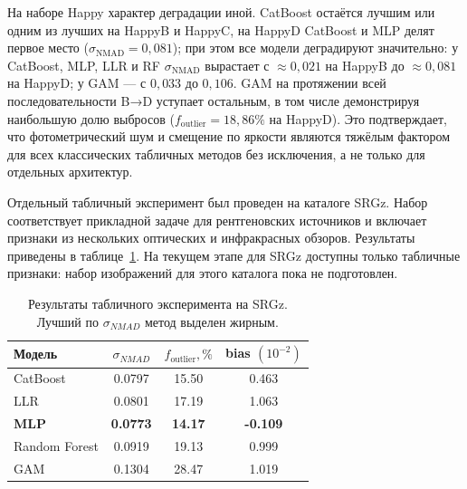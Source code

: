 \documentclass[12pt,a4paper]{article}
\begin{document}
На наборе Happy характер деградации иной. CatBoost остаётся лучшим или одним из лучших на HappyB и HappyC, на HappyD CatBoost и MLP делят первое место ($\sigma_{\mathrm{NMAD}} = 0{,}081$); при этом все модели деградируют значительно: у CatBoost, MLP, LLR и RF $\sigma_{\mathrm{NMAD}}$ вырастает с $\approx 0{,}021$ на HappyB до $\approx 0{,}081$ на HappyD; у GAM — с $0{,}033$ до $0{,}106$. GAM на протяжении всей последовательности B→D уступает остальным, в том числе демонстрируя наибольшую долю выбросов ($f_{\mathrm{outlier}} = 18{,}86\%$ на HappyD). Это подтверждает, что фотометрический шум и смещение по яркости являются тяжёлым фактором для всех классических табличных методов без исключения, а не только для отдельных архитектур.

Отдельный табличный эксперимент был проведен на каталоге SRGz. Набор соответствует прикладной задаче для рентгеновских источников и включает признаки из нескольких оптических и инфракрасных обзоров. Результаты приведены в таблице~\ref{tab:srgz-fast-results}. На текущем этапе для SRGz доступны только табличные признаки: набор изображений для этого каталога пока не подготовлен.

\begin{table}[htbp]
\centering
\caption{Результаты табличного эксперимента на SRGz. Лучший по $\sigma_{NMAD}$ метод выделен жирным.}
\label{tab:srgz-fast-results}
\small
\begin{tabular}{|l|c|c|c|}
\hline
Модель & $\sigma_{NMAD}$ & $f_{\mathrm{outlier}}, \%$ & bias $(10^{-2})$ \\
\hline
CatBoost & 0.0797 & 15.50 & 0.463 \\
LLR & 0.0801 & 17.19 & 1.063 \\
\textbf{MLP} & \textbf{0.0773} & \textbf{14.17} & \textbf{-0.109} \\
Random Forest & 0.0919 & 19.13 & 0.999 \\
GAM & 0.1304 & 28.47 & 1.019 \\
\hline
\end{tabular}
\end{table}
\end{document}
